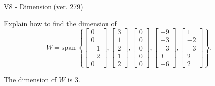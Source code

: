 \begin{exercise}
  \begin{exerciseTitle}V8 - Dimension (ver. 279)\end{exerciseTitle}
  \begin{exerciseStatement}
    Explain how to find the dimension of 
\[W=\mathrm{span}\ \left\{\left[\begin{array}{r}
0 \\
0 \\
-1 \\
-2 \\
0
\end{array}\right] , \left[\begin{array}{r}
3 \\
1 \\
2 \\
1 \\
2
\end{array}\right] , \left[\begin{array}{r}
0 \\
0 \\
0 \\
0 \\
0
\end{array}\right] , \left[\begin{array}{r}
-9 \\
-3 \\
-3 \\
3 \\
-6
\end{array}\right] , \left[\begin{array}{r}
1 \\
-2 \\
-3 \\
2 \\
2
\end{array}\right]\right\}.\]



  \end{exerciseStatement}
  \begin{exerciseAnswer}
   The dimension of \(W\) is  \(3\).
  


  \end{exerciseAnswer}
\end{exercise}